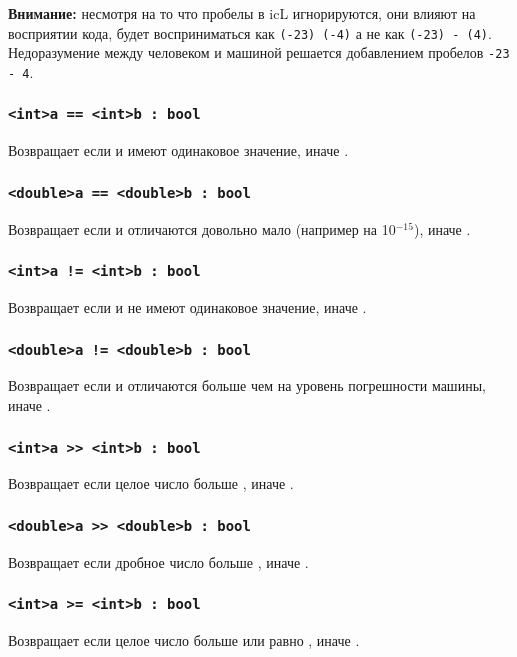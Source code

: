\documentclass[a4paper, 14pt]{extarticle}
\begin{document}
	{\bf Внимание:} несмотря на то что пробелы в icL игнорируются, они влияют на восприятии кода,  будет восприниматься как \lstinline`(-23) (-4)` а не как \lstinline`(-23) - (4)`. Недоразумение между человеком и машиной решается добавлением пробелов \lstinline`-23  - 4`.

\subsubsection{\lstinline`<int>a == <int>b : bool`}
	Возвращает  если  и  имеют одинаковое значение, иначе .

\subsubsection{\lstinline`<double>a == <double>b : bool`}
	Возвращает  если  и  отличаются довольно мало (например на 10$^{-15}$), иначе .

\subsubsection{\lstinline`<int>a != <int>b : bool`}
	Возвращает  если  и  не имеют одинаковое значение, иначе .

\subsubsection{\lstinline`<double>a != <double>b : bool`}
	Возвращает  если  и  отличаются больше чем на уровень погрешности машины, иначе .

\subsubsection{\lstinline`<int>a >> <int>b : bool`}
	Возвращает  если целое число  больше , иначе .

\subsubsection{\lstinline`<double>a >> <double>b : bool`}
	Возвращает  если дробное число  больше , иначе .

\subsubsection{\lstinline`<int>a >= <int>b : bool`}
	Возвращает  если целое число  больше или равно , иначе .
\end{document}
